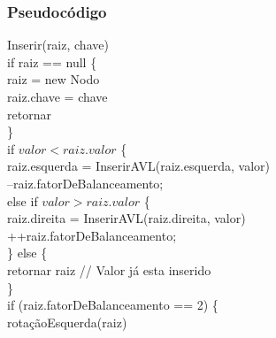 \documentclass{article}
\begin{document}
\subsubsection{Pseudocódigo}
Inserir(raiz, chave) { \\
\indent if raiz == null \{ \\
\indent\indent raiz = new Nodo \\
\indent\indent raiz.chave = chave \\
\indent\indent retornar \\
\indent \} \\
\indent   if $valor < raiz.valor$ \{ \\
\indent\indent raiz.esquerda = InserirAVL(raiz.esquerda, valor) \\
\indent\indent --raiz.fatorDeBalanceamento; \\
\indent} else if $valor > raiz.valor$ \{ \\
\indent\indent raiz.direita = InserirAVL(raiz.direita, valor) \\
\indent\indent ++raiz.fatorDeBalanceamento; \\
\indent \} else \{ \\
\indent\indent retornar raiz // Valor já esta inserido \\
\indent \} \\
\indent if (raiz.fatorDeBalanceamento == 2) \{ \\
\indent\indent rotaçãoEsquerda(raiz) \\
\end{document}
